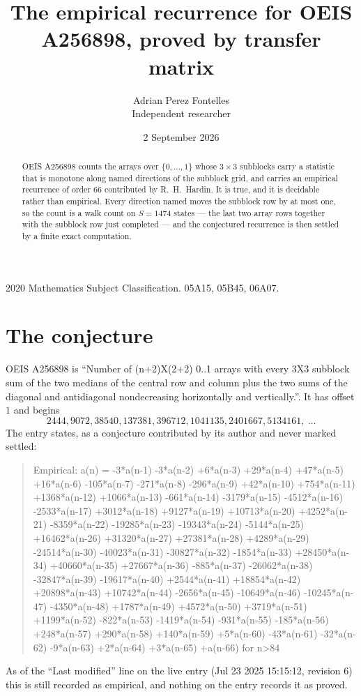 \documentclass[11pt,a4paper]{article}
\title{The empirical recurrence for OEIS A256898, proved by transfer matrix}
\author{Adrian Perez Fontelles\\ \small Independent researcher}
\date{2 September 2026}
\theoremstyle{plain}
\theoremstyle{definition}
\begin{document}
\maketitle

\begin{abstract}
OEIS A256898 counts the arrays over $\{0,\dots,1\}$ whose $3\times3$ subblocks carry a
statistic that is monotone along named directions of the subblock grid, and carries an
empirical recurrence of order $66$ contributed by R.~H.~Hardin. It is true, and it is
decidable rather than empirical. Every direction named moves the subblock row by at most one,
so the count is a walk count on $S=1474$ states --- the last two array rows together with the
subblock row just completed --- and the conjectured recurrence is then settled by a finite
exact computation.
\end{abstract}

\noindent\small 2020 Mathematics Subject Classification. 05A15, 05B45, 06A07.\normalsize

\section{The conjecture}

OEIS A256898 is ``Number of (n+2)X(2+2) 0..1 arrays with every 3X3 subblock sum of the two medians of the central row and column plus the two sums of the diagonal and antidiagonal nondecreasing horizontally and vertically.''. It has offset $1$ and begins
\[
2444, 9072, 38540, 137381, 396712, 1041135, 2401667, 5134161,\ \dots
\]
The entry states, as a conjecture contributed by its author and never marked settled:
\begin{quote}
Empirical: a(n) = -3*a(n-1) -3*a(n-2) +6*a(n-3) +29*a(n-4) +47*a(n-5) +16*a(n-6) -105*a(n-7) -271*a(n-8) -296*a(n-9) +42*a(n-10) +754*a(n-11) +1368*a(n-12) +1066*a(n-13) -661*a(n-14) -3179*a(n-15) -4512*a(n-16) -2533*a(n-17) +3012*a(n-18) +9127*a(n-19) +10713*a(n-20) +4252*a(n-21) -8359*a(n-22) -19285*a(n-23) -19343*a(n-24) -5144*a(n-25) +16462*a(n-26) +31320*a(n-27) +27381*a(n-28) +4289*a(n-29) -24514*a(n-30) -40023*a(n-31) -30827*a(n-32) -1854*a(n-33) +28450*a(n-34) +40660*a(n-35) +27667*a(n-36) -885*a(n-37) -26062*a(n-38) -32847*a(n-39) -19617*a(n-40) +2544*a(n-41) +18854*a(n-42) +20898*a(n-43) +10742*a(n-44) -2656*a(n-45) -10649*a(n-46) -10245*a(n-47) -4350*a(n-48) +1787*a(n-49) +4572*a(n-50) +3719*a(n-51) +1199*a(n-52) -822*a(n-53) -1419*a(n-54) -931*a(n-55) -185*a(n-56) +248*a(n-57) +290*a(n-58) +140*a(n-59) +5*a(n-60) -43*a(n-61) -32*a(n-62) -9*a(n-63) +2*a(n-64) +3*a(n-65) +a(n-66) for n>84
\end{quote}
As of the ``Last modified'' line on the live entry (Jul 23 2025 15:15:12, revision 6) this is still
recorded as empirical, and nothing on the entry records it as proved.
\end{document}
